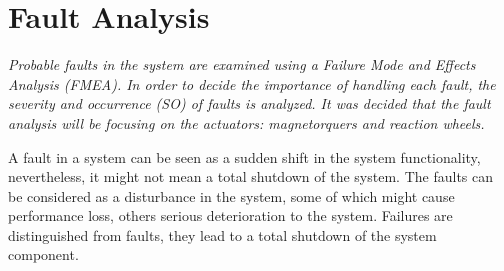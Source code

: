 \chapter{Fault  Analysis }
\label{chap:fault}
\textit{Probable faults in the system are examined using a  Failure Mode and Effects Analysis (FMEA). In order to decide the importance of handling each fault, the severity and occurrence (SO)  of faults is analyzed. It was decided that the fault analysis will be focusing on the actuators: magnetorquers and reaction wheels.}


A fault in a system can be seen as a sudden shift in the system functionality, nevertheless, it might not mean a total shutdown of the system. The faults can be considered as a disturbance in the system, some of which might cause performance loss, others serious deterioration to the system. Failures are distinguished from faults, they lead to a total shutdown of the system component. 

